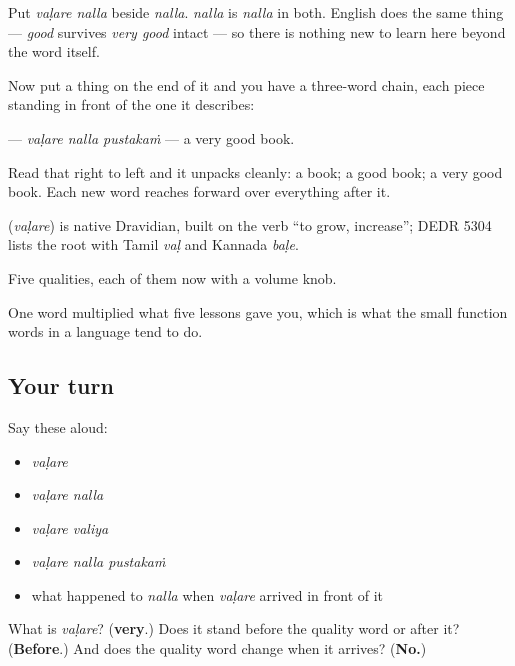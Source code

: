 Put \emph{vaḷare nalla} beside \emph{nalla}. \emph{nalla} is \emph{nalla} in both. English does the same thing — \emph{good} survives \emph{very good} intact — so there is nothing new to learn here beyond the word itself.

Now put a thing on the end of it and you have a three-word chain, each piece standing in front of the one it describes:

\textbf{  } — \emph{vaḷare nalla pustakaṁ} — a very good book.

Read that right to left and it unpacks cleanly: a book; a good book; a very good book. Each new word reaches forward over everything after it.

\begin{cousinweb}
\textbf{} (\emph{vaḷare}) is native Dravidian, built on the verb \textquotedblleft{}to grow, increase\textquotedblright{}; DEDR 5304 lists the root with Tamil \emph{vaḷ} and Kannada \emph{baḷe}.
\end{cousinweb}

\begin{grammarlens}[title={What you've built}]
Five qualities, each of them now with a volume knob.

One word multiplied what five lessons gave you, which is what the small function words in a language tend to do.
\end{grammarlens}

\subsection*{Your turn}
Say these aloud:

\begin{itemize}
\raggedright
  \item \emph{vaḷare}
  \item \emph{vaḷare nalla}
  \item \emph{vaḷare valiya}
  \item \emph{vaḷare nalla pustakaṁ}
  \item what happened to \emph{nalla} when \emph{vaḷare} arrived in front of it
\end{itemize}

\begin{tcolorbox}[breakable,colback=teal!4,colframe=teal!35!black,title={Before you move on}]
What is \emph{vaḷare}? (\textbf{very}.) Does it stand before the quality word or after it? (\textbf{Before}.) And does the quality word change when it arrives? (\textbf{No.})
\end{tcolorbox}
